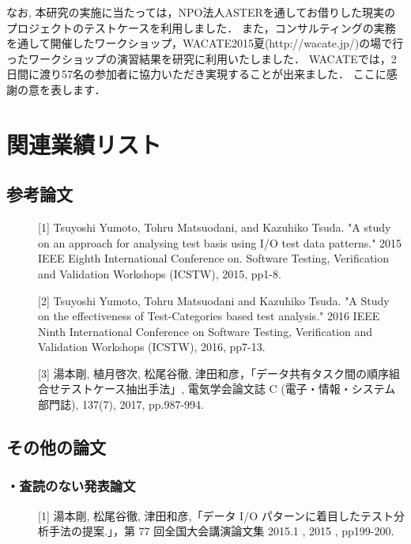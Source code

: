 \documentclass[a4paper,12pt]{jreport}
\begin{document}
なお, 本研究の実施に当たっては，NPO法人ASTERを通してお借りした現実のプロジェクトのテストケースを利用しました．
また，コンサルティングの実務を通して開催したワークショップ，WACATE2015夏(http://wacate.jp/)の場で行ったワークショップの演習結果を研究に利用いたしました．
WACATEでは，2日間に渡り57名の参加者に協力いただき実現することが出来ました．
ここに感謝の意を表します．



  
  

\chapter*{関連業績リスト}
\section*{参考論文}
\begin{description}
  \item[] [1] Tsuyoshi Yumoto, Tohru Matsuodani, and Kazuhiko Tsuda. "A study on an approach for analysing test basis using I/O test data patterns." 2015 IEEE Eighth International Conference on. Software Testing, Verification and Validation Workshops (ICSTW), 2015, pp1-8.
  \item[] [2] Tsuyoshi Yumoto, Tohru Matsuodani and Kazuhiko Tsuda. "A Study on the effectiveness of Test-Categories based test analysis." 2016 IEEE Ninth International Conference on Software Testing, Verification and Validation Workshops (ICSTW), 2016, pp7-13.
  \item[] [3] 湯本剛, 植月啓次, 松尾谷徹, 津田和彦，「データ共有タスク間の順序組合せテストケース抽出手法」, 電気学会論文誌 C (電子・情報・システム部門誌), 137(7), 2017, pp.987-994.
\end{description}

\section*{その他の論文}
\subsection*{・査読のない発表論文}
\begin{description}
  \item[] [1] 湯本剛, 松尾谷徹, 津田和彦,「データ I/O パターンに着目したテスト分析手法の提案.」，第 77 回全国大会講演論文集 2015.1 , 2015 , pp199-200.
\end{description}
\end{document}
